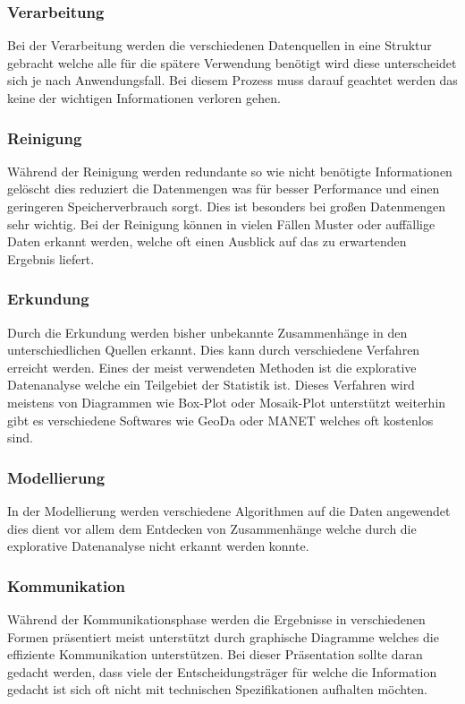 			\subsubsection{Verarbeitung}
				Bei der Verarbeitung werden die verschiedenen Datenquellen in eine Struktur gebracht welche alle für die spätere Verwendung benötigt wird diese unterscheidet sich je nach Anwendungsfall. Bei diesem Prozess muss darauf geachtet werden das keine der wichtigen Informationen verloren gehen. 
			
			\subsubsection{Reinigung}
				Während der Reinigung werden redundante so wie nicht benötigte Informationen gelöscht dies reduziert die Datenmengen was für besser Performance und einen geringeren Speicherverbrauch sorgt. Dies ist besonders bei großen Datenmengen sehr wichtig. Bei der Reinigung können in vielen Fällen Muster oder auffällige Daten erkannt werden, welche oft einen Ausblick auf das zu erwartenden Ergebnis liefert. 
			
			\subsubsection{Erkundung}
				Durch die Erkundung werden bisher unbekannte Zusammenhänge in den unterschiedlichen Quellen erkannt. Dies kann durch verschiedene Verfahren erreicht werden. Eines der meist verwendeten Methoden ist die explorative Datenanalyse welche ein Teilgebiet der Statistik ist. Dieses Verfahren wird meistens von Diagrammen wie Box-Plot oder Mosaik-Plot unterstützt weiterhin gibt es verschiedene Softwares wie GeoDa oder MANET welches oft kostenlos sind. 
				 
			\subsubsection{Modellierung}
				In der Modellierung werden verschiedene Algorithmen auf die Daten angewendet dies dient vor allem dem Entdecken von Zusammenhänge welche durch die explorative Datenanalyse nicht erkannt werden konnte. 
			
			\subsubsection{Kommunikation}
				Während der Kommunikationsphase werden die Ergebnisse in verschiedenen Formen präsentiert meist unterstützt durch graphische Diagramme welches die effiziente Kommunikation unterstützen. Bei dieser Präsentation sollte daran gedacht werden, dass viele der Entscheidungsträger für welche die Information gedacht ist sich oft nicht mit technischen Spezifikationen aufhalten möchten. 
			
